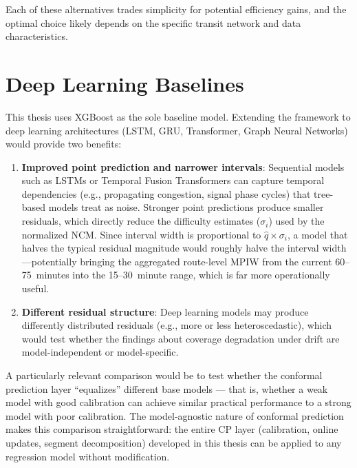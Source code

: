 Each of these alternatives trades simplicity for potential efficiency gains, and the optimal choice likely depends on the specific transit network and data characteristics.


\section{Deep Learning Baselines}
\label{sec:fw_deep_learning}

This thesis uses XGBoost as the sole baseline model. Extending the framework to deep learning architectures (LSTM, GRU, Transformer, Graph Neural Networks) would provide two benefits:

\begin{enumerate}
    \item \textbf{Improved point prediction and narrower intervals}: Sequential models such as LSTMs or Temporal Fusion Transformers can capture temporal dependencies (e.g., propagating congestion, signal phase cycles) that tree-based models treat as noise. Stronger point predictions produce smaller residuals, which directly reduce the difficulty estimates ($\sigma_i$) used by the normalized NCM. Since interval width is proportional to $\hat{q} \times \sigma_i$, a model that halves the typical residual magnitude would roughly halve the interval width---potentially bringing the aggregated route-level MPIW from the current 60--75~minutes into the 15--30~minute range, which is far more operationally useful.
    \item \textbf{Different residual structure}: Deep learning models may produce differently distributed residuals (e.g., more or less heteroscedastic), which would test whether the findings about coverage degradation under drift are model-independent or model-specific.
\end{enumerate}

A particularly relevant comparison would be to test whether the conformal prediction layer ``equalizes'' different base models --- that is, whether a weak model with good calibration can achieve similar practical performance to a strong model with poor calibration. The model-agnostic nature of conformal prediction makes this comparison straightforward: the entire CP layer (calibration, online updates, segment decomposition) developed in this thesis can be applied to any regression model without modification.


